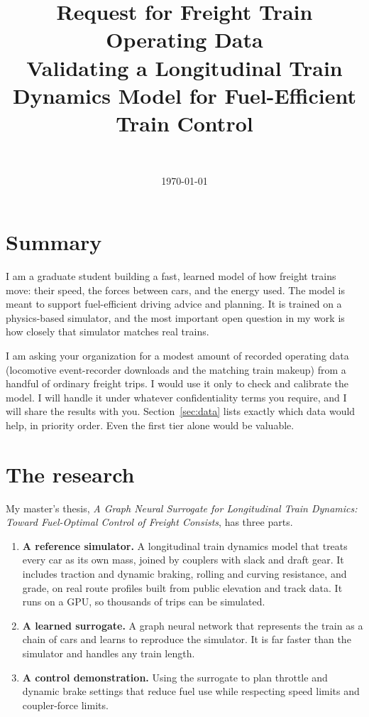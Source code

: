 \documentclass[11pt]{article}
\title{\vspace{-1.5em}\textbf{Request for Freight Train Operating Data}\\[4pt]
  \large Validating a Longitudinal Train Dynamics Model for Fuel-Efficient Train Control}
\author{\authorname\\ \small\authoraffil}
\date{\today}
\newcommand{\recipient}{your organization}   %
\begin{document}
\maketitle
\vspace{-1em}

\section*{Summary}

I am a graduate student building a fast, learned model of how freight trains
move: their speed, the forces between cars, and the energy used. The model is
meant to support fuel-efficient driving advice and planning. It is trained on
a physics-based simulator, and the most important open question in my work is
how closely that simulator matches real trains.

I am asking \recipient{} for a modest amount of recorded operating data
(locomotive event-recorder downloads and the matching train makeup) from a
handful of ordinary freight trips. I would use it only to check and calibrate
the model. I will handle it under whatever confidentiality terms you require,
and I will share the results with you. Section~\ref{sec:data} lists exactly
which data would help, in priority order. Even the first tier alone would be
valuable.

\section*{The research}

My master's thesis, \emph{A Graph Neural Surrogate for Longitudinal Train
Dynamics: Toward Fuel-Optimal Control of Freight Consists}, has three parts.
\begin{enumerate}
  \item \textbf{A reference simulator.} A longitudinal train dynamics model
    that treats every car as its own mass, joined by couplers with slack and
    draft gear. It includes traction and dynamic braking, rolling and curving
    resistance, and grade, on real route profiles built from public elevation
    and track data. It runs on a GPU, so thousands of trips can be simulated.
  \item \textbf{A learned surrogate.} A graph neural network that represents
    the train as a chain of cars and learns to reproduce the simulator. It
    is far faster than the simulator and handles any train length.
  \item \textbf{A control demonstration.} Using the surrogate to plan throttle
    and dynamic brake settings that reduce fuel use while respecting speed
    limits and coupler-force limits.
\end{enumerate}
\end{document}
